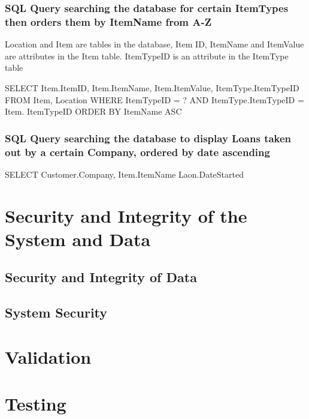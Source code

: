 \subsubsection{SQL Query searching the database for certain ItemTypes then orders them by ItemName from A-Z}
Location and Item are tables in the database, Item ID, ItemName and ItemValue are attributes in the Item table. ItemTypeID is an attribute in the ItemType table

\begin{sql}
    SELECT 
    Item.ItemID,
    Item.ItemName,
    Item.ItemValue,
    ItemType.ItemTypeID
    FROM Item, Location
    WHERE ItemTypeID = ? AND
    ItemType.ItemTypeID = Item. ItemTypeID
    ORDER BY ItemName ASC
\end{sql}

\subsubsection{SQL Query searching the database to display Loans taken out by a certain Company, ordered by date ascending}

\begin{sql}
    SELECT
    Customer.Company,
    Item.ItemName
    Laon.DateStarted
\end{sql}

\section{Security and Integrity of the System and Data}

\subsection{Security and Integrity of Data}

\subsection{System Security}

\section{Validation}

\section{Testing}

